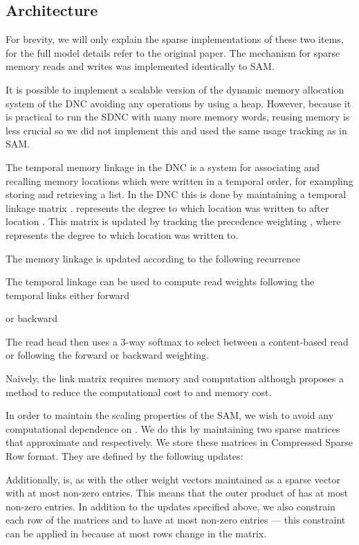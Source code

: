 \documentclass{article}
\begin{document}
\subsection{Architecture}
For brevity, we will only explain the sparse implementations of these two items, for the full model details refer to the original paper. The mechanism for sparse memory reads and writes was implemented identically to SAM.

It is possible to implement a scalable version of the dynamic memory allocation system of the DNC avoiding any  operations by using a heap. However, because it is practical to run the SDNC with many more memory words, reusing memory is less crucial so we did not implement this and used the same usage tracking as in SAM.

The temporal memory linkage in the DNC is a system for associating and recalling memory locations which were written in a temporal order, for exampling storing and retrieving a list. In the DNC this is done by maintaining a temporal linkage matrix .  represents the degree to which location  was written to after location . This matrix is updated by tracking the precedence weighting , where  represents the degree to which location  was written to.

The memory linkage is updated according to the following recurrence


The temporal linkage  can be used to compute read weights following the temporal links either forward

or backward

The read head then uses a 3-way softmax to select between a content-based read or following the forward or backward weighting.

Naively, the link matrix requires  memory and computation although \cite{graves2016dnc} proposes a method to reduce the computational cost to  and  memory cost.

In order to maintain the scaling properties of the SAM, we wish to avoid any computational dependence on . We do this by maintaining two sparse matrices  that approximate  and  respectively.  We store these matrices in Compressed Sparse Row format. They are defined by the following updates:

Additionally,  is, as with the other weight vectors maintained as a sparse vector with at most  non-zero entries. This means that the outer product of  has at most  non-zero entries. In addition to the updates specified above, we also constrain each row of the matrices  and  to have at most  non-zero entries --- this constraint can be applied in  because at most  rows change in the matrix.
\end{document}
